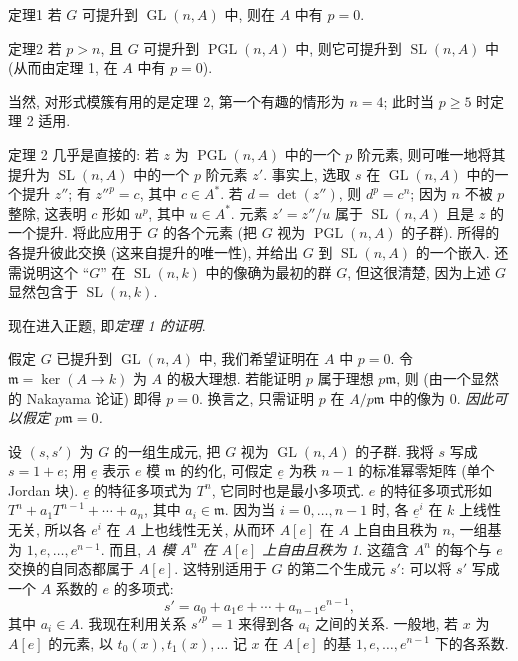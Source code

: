 \begin{origstatement}{定理}{1}
若 $G$ 可提升到 $\operatorname{GL}(n,A)$ 中, 则在 $A$ 中有 $p=0$.
\end{origstatement}
\begin{origstatement}{定理}{2}
若 $p>n$, 且 $G$ 可提升到 $\operatorname{PGL}(n,A)$ 中, 则它可提升到 $\operatorname{SL}(n,A)$ 中 (从而由定理 1, 在 $A$ 中有 $p=0$).
\end{origstatement}
当然, 对形式模簇有用的是定理 2, 第一个有趣的情形为 $n=4$; 此时当 $p\geq5$ 时定理 2 适用.

定理 2 几乎是直接的: 若 $z$ 为 $\operatorname{PGL}(n,A)$ 中的一个 $p$ 阶元素, 则可唯一地将其提升为 $\operatorname{SL}(n,A)$ 中的一个 $p$ 阶元素 $z'$. 事实上,
选取 $s$ 在 $\operatorname{GL}(n,A)$ 中的一个提升 $z''$; 有 $z''^p=c$, 其中 $c\in A^*$. 若 $d=\det(z'')$, 则 $d^p=c^n$; 因为 $n$ 不被 $p$ 整除, 这表明 $c$ 形如 $u^p$, 其中 $u\in A^*$. 元素 $z'=z''/u$ 属于 $\operatorname{SL}(n,A)$ 且是 $z$ 的一个提升. 将此应用于 $G$ 的各个元素 (把 $G$ 视为 $\operatorname{PGL}(n,A)$ 的子群). 所得的各提升彼此交换 (这来自提升的唯一性), 并给出 $G$ 到 $\operatorname{SL}(n,A)$ 的一个嵌入. 还需说明这个 ``$G$'' 在 $\operatorname{SL}(n,k)$ 中的像确为最初的群 $G$, 但这很清楚, 因为上述 $G$ 显然包含于 $\operatorname{SL}(n,k)$.

现在进入正题, 即\emph{定理 1 的证明}.

假定 $G$ 已提升到 $\operatorname{GL}(n,A)$ 中, 我们希望证明在 $A$ 中 $p=0$. 令 $\mathfrak m=\ker(A\to k)$ 为 $A$ 的极大理想. 若能证明 $p$ 属于理想 $p\mathfrak m$, 则 (由一个显然的 Nakayama 论证) 即得 $p=0$. 换言之, 只需证明 $p$ 在 $A/p\mathfrak m$ 中的像为 $0$. \emph{因此可以假定 $p\mathfrak m=0$.}

设 $(s,s')$ 为 $G$ 的一组生成元, 把 $G$ 视为 $\operatorname{GL}(n,A)$ 的子群. 我将 $s$ 写成 $s=1+e$; 用 $\underline e$ 表示 $e$ 模 $\mathfrak m$ 的约化, 可假定 $\underline e$ 为秩 $n-1$ 的标准幂零矩阵 (单个 Jordan 块). $\underline e$ 的特征多项式为 $T^n$, 它同时也是最小多项式. $e$ 的特征多项式形如 $T^n+a_1T^{n-1}+\cdots+a_n$, 其中 $a_i\in\mathfrak m$. 因为当 $i=0,\ldots,n-1$ 时, 各 $\underline e^i$ 在 $k$ 上线性无关, 所以各 $e^i$ 在 $A$ 上也线性无关, 从而环 $A[e]$ 在 $A$ 上自由且秩为 $n$, 一组基为 $1,e,\ldots,e^{n-1}$. 而且, \emph{$A$ 模 $A^n$ 在 $A[e]$ 上自由且秩为 1}. 这蕴含 $A^n$ 的每个与 $e$ 交换的自同态都属于 $A[e]$. 这特别适用于 $G$ 的第二个生成元 $s'$: 可以将 $s'$ 写成一个 $A$ 系数的 $e$ 的多项式:
\[s'=a_0+a_1e+\cdots+a_{n-1}e^{n-1},\]
其中 $a_i\in A$. 我现在利用关系 $s'^p=1$ 来得到各 $a_i$ 之间的关系. 一般地, 若 $x$ 为 $A[e]$ 的元素, 以 $t_0(x),t_1(x),\ldots$ 记 $x$ 在 $A[e]$ 的基 $1,e,\ldots,e^{n-1}$ 下的各系数.

